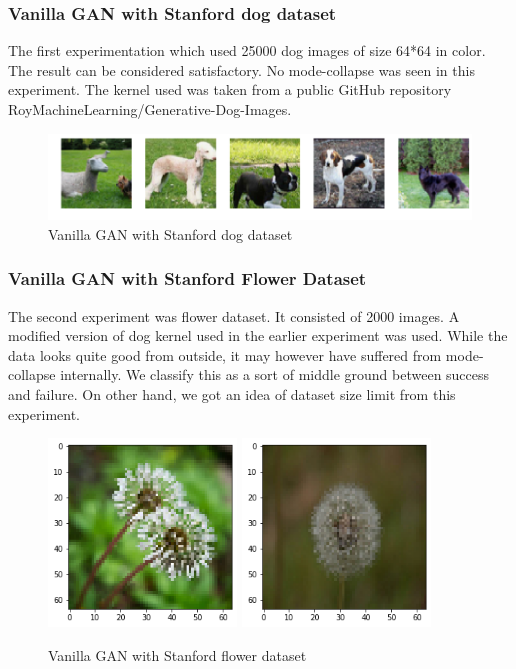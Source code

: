 \documentclass{article}
\begin{document}
\subsubsection{Vanilla GAN with Stanford dog dataset}
The first experimentation which used 25000 dog images of size 64*64 in color. The result can be considered satisfactory. No mode-collapse was seen in this experiment. The kernel used was taken from a public GitHub repository RoyMachineLearning/Generative-Dog-Images.
\begin{figure}[H]
    \centering
    \includegraphics[width=15cm]{images/dogGAN.png}
    \caption{Vanilla GAN with Stanford dog dataset}
\end{figure}


\subsubsection{Vanilla GAN with Stanford Flower Dataset}
The second experiment was flower dataset. It consisted of 2000 images. A modified version of dog kernel used in the earlier experiment was used. While the data looks quite good from outside, it may however have suffered from mode-collapse internally. We classify this as a sort of middle ground between success and failure. On other hand, we got an idea of dataset size limit from this experiment.

\begin{figure}[H]
    \centering
    \includegraphics[width=5cm]{images/FlowerGANdandelion.png}
    \includegraphics[width=5cm]{images/FlowerGANdandelion2.png}
    \caption{Vanilla GAN with Stanford flower dataset}
\end{figure}
\end{document}
